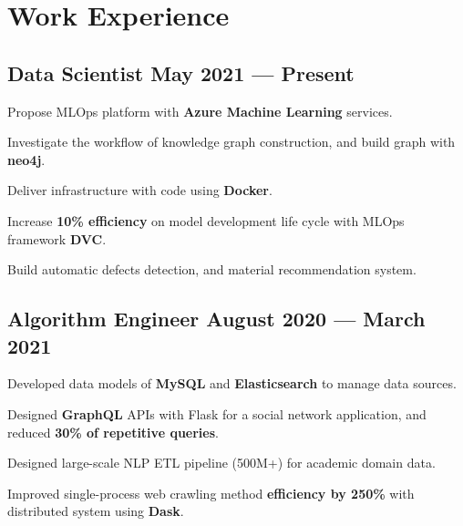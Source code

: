 \section{Work Experience}

\subsection*{Data Scientist \hfill May 2021 --- Present} 
    \begin{zitemize}
        \item Propose MLOps platform with \textbf{Azure Machine Learning} services.
        \item Investigate the workflow of knowledge graph construction, and build graph with \textbf{neo4j}.
        \item Deliver infrastructure with code using \textbf{Docker}.
        \item Increase \textbf{10\% efficiency} on model development life cycle with MLOps framework \textbf{DVC}.
        \item Build automatic defects detection, and material recommendation system.
    \end{zitemize}


\subsection*{Algorithm Engineer \hfill August 2020 --- March 2021} 
    \begin{zitemize}
        \item Developed data models of \textbf{MySQL} and \textbf{Elasticsearch} to manage data sources.
        \item Designed \textbf{GraphQL} APIs with Flask for a social network application, and reduced \textbf{30\% of repetitive queries}.
        \item Designed large-scale NLP ETL pipeline (500M+) for academic domain data.
        \item Improved single-process web crawling method \textbf{efficiency by 250\%} with distributed system using \textbf{Dask}.
    \end{zitemize}


